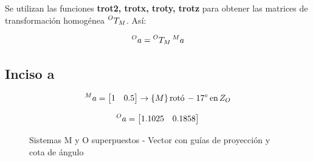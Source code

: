 \documentclass[a4paper,12pt]{article}
\begin{document}
Se utilizan las funciones \textbf{trot2, trotx, troty, trotz} para obtener las matrices de transformación
homogénea $\prescript{O}{}{T_M}$. Así:

\begin{equation}
    \prescript{O}{}{a} = \prescript{O}{}{T_M}\prescript{M}{}{a}
    \label{transformacion}
\end{equation}


\subsection{Inciso a}
\begin{equation*}
    \prescript{M}{}{a} = 
    \begin{bmatrix}
        1 & 0.5
    \end{bmatrix}
    \rightarrow \{M\} \, \text{rotó} \,  -17^\circ \, \text{en}\, Z_O
\end{equation*}

\begin{equation*}
    \prescript{O}{}{a} = 
    \begin{bmatrix}
        1.1025 & 0.1858
    \end{bmatrix}
\end{equation*}

\begin{figure}[H]
    \centering
    \begin{adjustbox}{scale = 0.85, max width=\columnwidth}
    \end{adjustbox}
    \caption{Sistemas M y O superpuestos - Vector con guías de proyección y cota de ángulo}
\end{figure}
\end{document}
